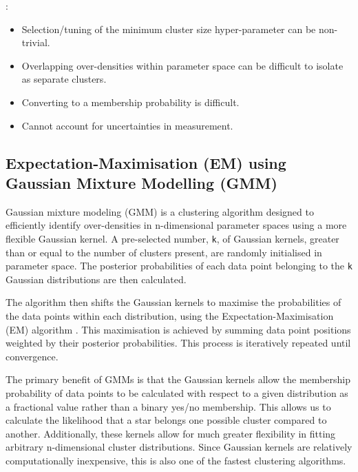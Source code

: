 : 
\begin{itemize}
    \item Selection/tuning of the minimum cluster size hyper-parameter can be non-trivial.
    \item Overlapping over-densities within parameter space can be difficult to isolate as separate clusters.
    \item Converting to a membership probability is difficult.
    \item Cannot account for uncertainties in measurement.
\end{itemize}

\subsection{Expectation-Maximisation (EM) using Gaussian Mixture Modelling (GMM)}

Gaussian mixture modeling (GMM) \cite[e.g.][]{mclachlan_finite_2004} is a clustering algorithm designed to efficiently identify over-densities in n-dimensional parameter spaces using a more flexible Gaussian kernel. A pre-selected number, \texttt{k}, of Gaussian kernels, greater than or equal to the number of clusters present, are randomly initialised in parameter space. The posterior probabilities of each data point belonging to the \texttt{k} Gaussian distributions are then calculated. 

The algorithm then shifts the Gaussian kernels to maximise the probabilities of the data points within each distribution, using the Expectation-Maximisation (EM) algorithm \citep{blei_variational_2005}. This maximisation is achieved by summing data point positions weighted by their posterior probabilities. This process is iteratively repeated until convergence. 

The primary benefit of GMMs is that the Gaussian kernels allow the membership probability of data points to be calculated with respect to a given distribution as a fractional value rather than a binary yes/no membership. This allows us to calculate the likelihood that a star belongs one possible cluster compared to another. Additionally, these kernels allow for much greater flexibility in fitting arbitrary n-dimensional cluster distributions. Since Gaussian kernels are relatively computationally inexpensive, this is also one of the fastest clustering algorithms.

\vspace{10pt}


